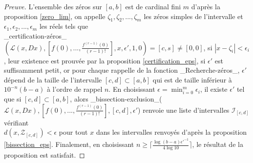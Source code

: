 \documentclass[a4paper,10pt]{article}
\begin{document}
	\begin{proof}[Preuve]
		L'ensemble des zéros sur $[a,b]$ est de cardinal fini $m$ d'après la proposition \eqref{zero_lim}, on appelle $\zeta_1,\zeta_2,...,\zeta_m$ les zéros simples de l'intervalle et $\epsilon_1, \epsilon_2,...,\epsilon_m$ les réels tels que\\ \_certification-zéros\_$(\mathcal{L}(x,Dx),[f(0),...,\frac{f^{(r-1)}(0)}{(r-1)!}],x,\epsilon',1,0) =[c,s] \neq [0,0]$, si $|x-\zeta_i|<\epsilon_i$, leur existence est prouvée par la proposition \ref{certification_eps}, si $\epsilon'$ est suffisamment petit, or pour chaque rappelle de la fonction \_Recherche-zéros\_,  $\epsilon'$ dépend de la taille de l'intervalle $[c,d] \subset [a,b]$ qui est de taille inférieur à $10^{-n}(b-a)$ à l'ordre de rappel $n$. 
		En choisissant $\epsilon=\min_{i=0}^{m} \epsilon_i$, il existe $\epsilon'$ tel que si $[c,d]\subset [a,b]$, alors  \_bissection-exclusion\_($\mathcal{L}(x,Dx),[f(0),...,\frac{f^{(r-1)}(0)}{(r-1)!}],[c,d],\epsilon'$) renvoie une liste d'intervalles $\mathcal{I}_{[c,d]}$ vérifiant\\
		$d(x,\mathcal{Z}_{[c,d]})<\epsilon$ pour tout $x$ dans les intervalles renvoyés d'après la proposition \ref{bissection_eps}. Finalement, en choisissant $n\geq \big\lceil\frac{\log(b-a)\epsilon'^{-1}}{4\log 10}\big\rceil$, le résultat de la proposition est satisfait.
	\end{proof}
	
	
	\newpage
	
	
\end{document}
